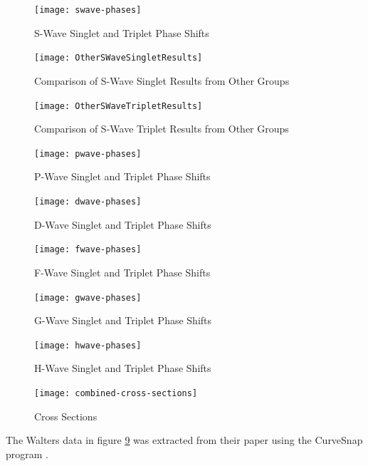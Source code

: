 \documentclass[preprint,showpacs,preprintnumbers,amsmath,amssymb]{revtex4}
\begin{document}
\begin{figure}[ht]
	\centering
	\texttt{[image: swave-phases]}
	\caption{S-Wave Singlet and Triplet Phase Shifts}
	\label{fig:swave-phases}
\end{figure}

\begin{figure}[ht]
	\centering
	\texttt{[image: OtherSWaveSingletResults]}
	\caption{Comparison of S-Wave Singlet Results from Other Groups}
	\label{fig:OtherSWaveSingletResults}
\end{figure}

\begin{figure}[ht]
	\centering
	\texttt{[image: OtherSWaveTripletResults]}
	\caption{Comparison of S-Wave Triplet Results from Other Groups}
	\label{fig:OtherSWaveTripletResults}
\end{figure}


\begin{figure}[ht]
	\centering
	\texttt{[image: pwave-phases]}
	\caption{P-Wave Singlet and Triplet Phase Shifts}
	\label{fig:pwave-phases}
\end{figure}


\begin{figure}[ht]
	\centering
	\texttt{[image: dwave-phases]}
	\caption{D-Wave Singlet and Triplet Phase Shifts}
	\label{fig:dwave-phases}
\end{figure}


\begin{figure}[ht]
	\centering
	\texttt{[image: fwave-phases]}
	\caption{F-Wave Singlet and Triplet Phase Shifts}
	\label{fig:fwave-phases}
\end{figure}


\begin{figure}[ht]
	\centering
	\texttt{[image: gwave-phases]}
	\caption{G-Wave Singlet and Triplet Phase Shifts}
	\label{fig:gwave-phases}
\end{figure}

\begin{figure}[ht]
	\centering
	\texttt{[image: hwave-phases]}
	\caption{H-Wave Singlet and Triplet Phase Shifts}
	\label{fig:hwave-phases}
\end{figure}


\begin{figure}[ht]
	\centering
	\texttt{[image: combined-cross-sections]}
	\caption{Cross Sections}
	\label{fig:combined-cross-sections}
\end{figure}

The Walters data \cite{Walters2004} in figure \ref{fig:combined-cross-sections} was extracted from their paper using the CurveSnap program \cite{CurveSnap}.
\end{document}
